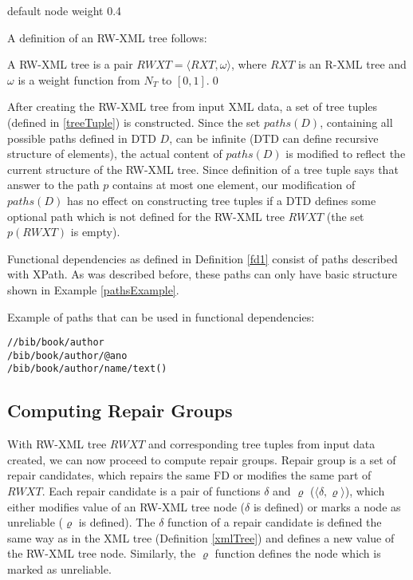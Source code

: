 \begin{example}

default node weight 0.4
\end{example}


A definition of an RW-XML tree follows:

\begin{define}
A RW-XML tree is a pair $RWXT = \langle RXT, \omega \rangle$, where $RXT$ is an R-XML tree and $\omega$ is a weight function from $N_T$ to $[0,1]$.\qed
\end{define}

After creating the RW-XML tree from input XML data, a set of tree tuples (defined in \ref{treeTuple}) is constructed. Since the set $paths(D)$, containing all possible paths defined in DTD $D$, can be infinite (DTD can define recursive structure of elements), the actual content of $paths(D)$ is modified to reflect the current structure of the RW-XML tree. Since definition of a tree tuple says that answer to the path $p$ contains at most one element, our modification of $paths(D)$ has no effect on constructing tree tuples if a DTD defines some optional path which is not defined for the RW-XML tree $RWXT$ (the set $p(RWXT)$ is empty).

Functional dependencies as defined in Definition \ref{fd1} consist of paths described with XPath. As was described before, these paths can only have basic structure shown in Example \ref{pathsExample}.

\begin{example}\label{pathsExample}
Example of paths that can be used in functional dependencies:
\begin{verbatim}
//bib/book/author
/bib/book/author/@ano
/bib/book/author/name/text()
\end{verbatim}
\end{example}

\subsection{Computing Repair Groups}

With RW-XML tree $RWXT$ and corresponding tree tuples from input data created, we can now proceed to compute repair groups. Repair group is a set of repair candidates, which repairs the same FD or modifies the same part of $RWXT$. Each repair candidate is a pair of functions $\delta$ and $\varrho$ ($\langle \delta, \varrho \rangle$), which either modifies value of an RW-XML tree node ($\delta$ is defined) or marks a node as unreliable ($\varrho$ is defined). The $\delta$ function of a repair candidate is defined the same way as in the XML tree (Definition \ref{xmlTree}) and defines a new value of the RW-XML tree node. Similarly, the $\varrho$ function defines the node which is marked as unreliable.


